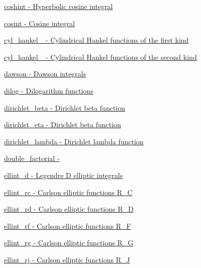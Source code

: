 \begin{DoxyItemize}
\item \hyperlink{group__gnu__math__spec__func_ga901c23871fded7d4467a864fe06bbf07}{coshint -\/ Hyperbolic cosine integral}
\item \hyperlink{group__gnu__math__spec__func_ga06eed76a045a73ad72fcf4ad00b05f96}{cosint -\/ Cosine integral}
\item \hyperlink{group__gnu__math__spec__func_gafa5ad1cfd4cc30caaeb06bdab71e600b}{cyl\+\_\+hankel\+\_ -\/ Cylindrical Hankel functions of the first kind}
\item \hyperlink{group__gnu__math__spec__func_ga6c1d2d390e547ded9e0f4cc46395d90c}{cyl\+\_\+hankel\+\_ -\/ Cylindrical Hankel functions of the second kind}
\item \hyperlink{group__gnu__math__spec__func_ga0623ddcbfdce696781e19648fde6f33a}{dawson -\/ Dawson integrals}
\item \hyperlink{group__gnu__math__spec__func_ga7a95a3cb9a53aca2a1ff9752ce9d5e3c}{dilog -\/ Dilogarithm functions}
\item \hyperlink{group__gnu__math__spec__func_ga87466a2d429a2815d794acc21c882b08}{dirichlet\+\_\+beta -\/ Dirichlet beta function}
\item \hyperlink{group__gnu__math__spec__func_gae46e26e4107675d285c79a2d6202e6c7}{dirichlet\+\_\+eta -\/ Dirichlet beta function}
\item \hyperlink{group__gnu__math__spec__func_ga06842a81bdcabf9c62252dde992d42ee}{dirichlet\+\_\+lambda -\/ Dirichlet lambda function}
\item \hyperlink{group__gnu__math__spec__func_ga08c31a5dd1686a7633b46f923c47af46}{double\+\_\+factorial -\/ }
\item \hyperlink{group__gnu__math__spec__func_ga71785ba6bad83f009cb2dc4d2d574194}{ellint\+\_\+d -\/ Legendre D elliptic integrals}
\item \hyperlink{group__gnu__math__spec__func_ga21b90daf6c8d705b052304905809d2db}{ellint\+\_\+rc -\/ Carlson elliptic functions R\+\_\+C}
\item \hyperlink{group__gnu__math__spec__func_ga6467a19028332392df825e232a97139f}{ellint\+\_\+rd -\/ Carlson elliptic functions R\+\_\+D}
\item \hyperlink{group__gnu__math__spec__func_ga9242fbc43bd340e0def2a6f15b755c1c}{ellint\+\_\+rf -\/ Carlson elliptic functions R\+\_\+F}
\item \hyperlink{group__gnu__math__spec__func_gab525116e1b311da90e2745366ac314eb}{ellint\+\_\+rg -\/ Carlson elliptic functions R\+\_\+G}
\item \hyperlink{group__gnu__math__spec__func_gaf9a96979913713963c5f4edeba8c7f5a}{ellint\+\_\+rj -\/ Carlson elliptic functions R\+\_\+J}

\end{DoxyItemize}
